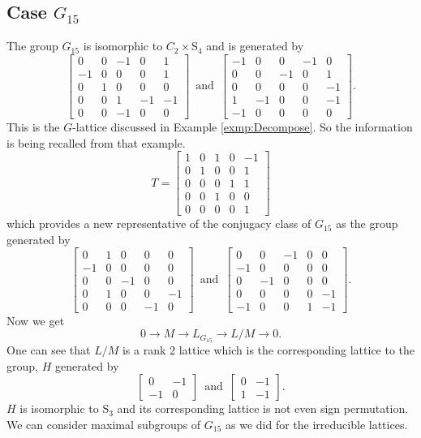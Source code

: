 \documentclass{article}
\theoremstyle{plain}
\theoremstyle{definition}
\newcommand{\tand}{\ensuremath{\,\,\, \text{and} \,\,\,}}
\begin{document}
\subsection{Case $G_{15}$}
The group $G_{15} $ is isomorphic to $C_2 \times \mathrm{S}_4$ and is generated by 
$$
\left[ \begin {array}{ccccc} 0&0&-1&0&1\\ -1&0&0&0&
1\\ 0&1&0&0&0\\ 0&0&1&-1&-1
\\ 0&0&-1&0&0\end {array} \right] 
\tand
 \left[ \begin {array}{ccccc} -1&0&0&-1&0\\ 0&0&-1&0
&1\\ 0&0&0&0&-1\\ 1&-1&0&0&-1
\\ -1&0&0&0&0\end {array} \right].
$$
This is the $G$-lattice discussed in Example \ref{exmp:Decompose}. So the information is being recalled from that example.
$$
T = \left[ \begin {array}{ccccc} 1&0&1&0&-1\\ 0&1&0&0&1
\\0&0&0&1&1\\0&0&1&0&0
\\0&0&0&0&1\end {array} \right] 
$$
which provides a new representative of the conjugacy class of $G_{15}$ as the group generated by  
$$
 \left[ \begin {array}{ccc|cc} 0&1&0&0&0\\-1&0&0&0&0
\\0&0&-1&0&0\\ \hline 0&1&0&0&-1
\\0&0&0&-1&0\end {array} \right] 
\tand
 \left[ \begin {array}{ccc|cc} 0&0&-1&0&0\\-1&0&0&0&0
\\0&-1&0&0&0\\ \hline 0&0&0&0&-1
\\-1&0&0&1&-1\end {array} \right].
$$ 
Now we get 
$$0 \longrightarrow M \longrightarrow L_{G_{15}}\longrightarrow L/M \longrightarrow 0.$$
One can see that $L/M$ is  a rank 2 lattice which is the corresponding lattice to the group, $H$ generated by 
$$
\begin{bmatrix}
0&-1\\
-1&0
\end{bmatrix}
\tand 
\begin{bmatrix}
0&-1\\
1 & -1
\end{bmatrix}.
$$ 
$H$ is isomorphic to $\mathrm{S}_3$ and its corresponding lattice is not even sign permutation. We can consider maximal subgroups of $G_{15}$ as we did for the irreducible lattices.
\end{document}
